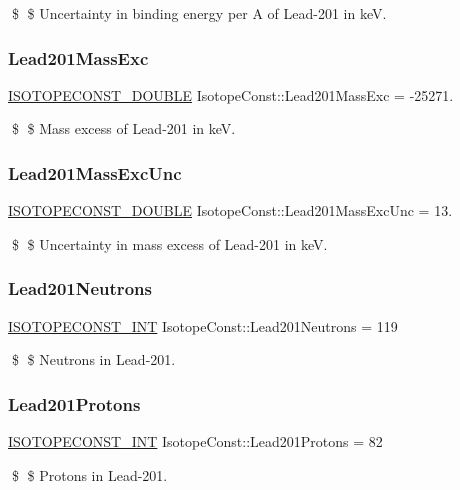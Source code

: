 \$ \$ Uncertainty in binding energy per A of Lead-\/201 in keV. \mbox{\label{group___isotope_const-_lead-_pb201_ga8b2b2f33b82cabb1cbe7f9123aca1e90}} 
\subsubsection{\texorpdfstring{Lead201\+Mass\+Exc}{Lead201MassExc}}
{\footnotesize\ttfamily \mbox{\hyperlink{group___isotope_const-_macros_ga8f45a7272ce02c0b4c65c44636ed719a}{I\+S\+O\+T\+O\+P\+E\+C\+O\+N\+S\+T\+\_\+\+D\+O\+U\+B\+LE}} Isotope\+Const\+::\+Lead201\+Mass\+Exc = -\/25271.}

\$ \$ Mass excess of Lead-\/201 in keV. \mbox{\label{group___isotope_const-_lead-_pb201_ga03800ac56845b09b2fed2b2989f51edb}} 
\subsubsection{\texorpdfstring{Lead201\+Mass\+Exc\+Unc}{Lead201MassExcUnc}}
{\footnotesize\ttfamily \mbox{\hyperlink{group___isotope_const-_macros_ga8f45a7272ce02c0b4c65c44636ed719a}{I\+S\+O\+T\+O\+P\+E\+C\+O\+N\+S\+T\+\_\+\+D\+O\+U\+B\+LE}} Isotope\+Const\+::\+Lead201\+Mass\+Exc\+Unc = 13.}

\$ \$ Uncertainty in mass excess of Lead-\/201 in keV. \mbox{\label{group___isotope_const-_lead-_pb201_ga36b1caefe5db9f1a98a7c1e3ece789eb}} 
\subsubsection{\texorpdfstring{Lead201\+Neutrons}{Lead201Neutrons}}
{\footnotesize\ttfamily \mbox{\hyperlink{group___isotope_const-_macros_ga5f18360b3e99483a35c32d789e62621c}{I\+S\+O\+T\+O\+P\+E\+C\+O\+N\+S\+T\+\_\+\+I\+NT}} Isotope\+Const\+::\+Lead201\+Neutrons = 119}

\$ \$ Neutrons in Lead-\/201. \mbox{\label{group___isotope_const-_lead-_pb201_ga65801cd7f476a07bb3f22913690df10b}} 
\subsubsection{\texorpdfstring{Lead201\+Protons}{Lead201Protons}}
{\footnotesize\ttfamily \mbox{\hyperlink{group___isotope_const-_macros_ga5f18360b3e99483a35c32d789e62621c}{I\+S\+O\+T\+O\+P\+E\+C\+O\+N\+S\+T\+\_\+\+I\+NT}} Isotope\+Const\+::\+Lead201\+Protons = 82}

\$ \$ Protons in Lead-\/201. 